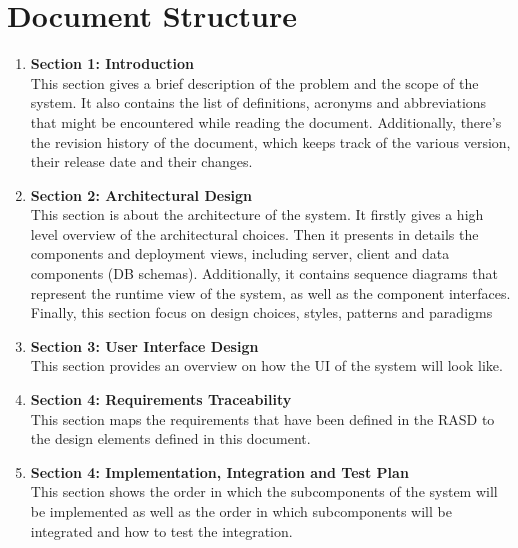 \section{Document Structure}

\begin{enumerate}
    \item \textbf{Section 1: Introduction} \\
    This section gives a brief description of the problem and the scope of the system.
    It also contains the list of definitions, acronyms and abbreviations that might be encountered
    while reading the document.
    Additionally, there's the revision history of the document, which keeps track of the various
    version, their release date and their changes.
    \item \textbf{Section 2: Architectural Design} \\
    This section is about the architecture of the system. 
    It firstly gives a high level overview of the architectural choices.
    Then it presents in details the components and deployment views, including server, client and data components (DB schemas).
    Additionally, it contains sequence diagrams that represent the runtime view of the system, as well as the component interfaces.
    Finally, this section focus on design choices, styles, patterns and paradigms
    \item \textbf{Section 3: User Interface Design} \\
    This section provides an overview on how the UI of the system will look like.
    \item \textbf{Section 4: Requirements Traceability} \\
    This section maps the requirements that have been defined in the RASD to the design elements defined in this document.
    \item \textbf{Section 4: Implementation, Integration and Test Plan} \\
    This section shows the order in which the subcomponents of the system will be implemented as well
    as the order in which subcomponents will be integrated and how to test the integration.
\end{enumerate}